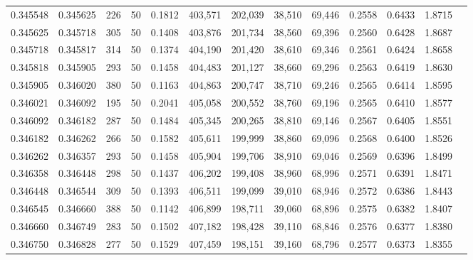 \begin{tabular}{rrrrrrrrrrrrr}
0.345548 & 0.345625 &   226 &  50 &                                     0.1812 & 403,571 & 202,039 &  38,510 &  69,446 & 0.2558 & 0.6433 & 1.8715 \\
0.345625 & 0.345718 &   305 &  50 &                                     0.1408 & 403,876 & 201,734 &  38,560 &  69,396 & 0.2560 & 0.6428 & 1.8687 \\
0.345718 & 0.345817 &   314 &  50 &                                     0.1374 & 404,190 & 201,420 &  38,610 &  69,346 & 0.2561 & 0.6424 & 1.8658 \\
0.345818 & 0.345905 &   293 &  50 &                                     0.1458 & 404,483 & 201,127 &  38,660 &  69,296 & 0.2563 & 0.6419 & 1.8630 \\
0.345905 & 0.346020 &   380 &  50 &                                     0.1163 & 404,863 & 200,747 &  38,710 &  69,246 & 0.2565 & 0.6414 & 1.8595 \\
0.346021 & 0.346092 &   195 &  50 &                                     0.2041 & 405,058 & 200,552 &  38,760 &  69,196 & 0.2565 & 0.6410 & 1.8577 \\
0.346092 & 0.346182 &   287 &  50 &                                     0.1484 & 405,345 & 200,265 &  38,810 &  69,146 & 0.2567 & 0.6405 & 1.8551 \\
0.346182 & 0.346262 &   266 &  50 &                                     0.1582 & 405,611 & 199,999 &  38,860 &  69,096 & 0.2568 & 0.6400 & 1.8526 \\
0.346262 & 0.346357 &   293 &  50 &                                     0.1458 & 405,904 & 199,706 &  38,910 &  69,046 & 0.2569 & 0.6396 & 1.8499 \\
0.346358 & 0.346448 &   298 &  50 &                                     0.1437 & 406,202 & 199,408 &  38,960 &  68,996 & 0.2571 & 0.6391 & 1.8471 \\
0.346448 & 0.346544 &   309 &  50 &                                     0.1393 & 406,511 & 199,099 &  39,010 &  68,946 & 0.2572 & 0.6386 & 1.8443 \\
0.346545 & 0.346660 &   388 &  50 &                                     0.1142 & 406,899 & 198,711 &  39,060 &  68,896 & 0.2575 & 0.6382 & 1.8407 \\
0.346660 & 0.346749 &   283 &  50 &                                     0.1502 & 407,182 & 198,428 &  39,110 &  68,846 & 0.2576 & 0.6377 & 1.8380 \\
0.346750 & 0.346828 &   277 &  50 &                                     0.1529 & 407,459 & 198,151 &  39,160 &  68,796 & 0.2577 & 0.6373 & 1.8355 \\

\end{tabular}
